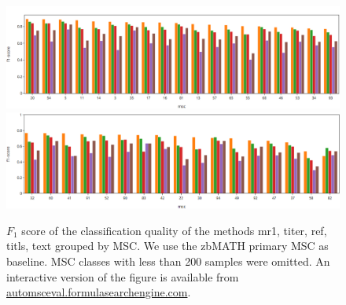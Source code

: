 \begin{figure}[h]
  \centering
  \includegraphics[width=1.1\textwidth]{overview1.png}
  \includegraphics[width=1.1\textwidth]{overview2.png}
  \caption{$F_1$ score of the classification quality of the methods mr1, titer, ref, titls, text grouped by MSC. We use the zbMATH primary MSC as baseline. MSC classes with less than 200 samples were omitted. An interactive version of the figure is available from \url{automsceval.formulasearchengine.com}.}
\end{figure}


